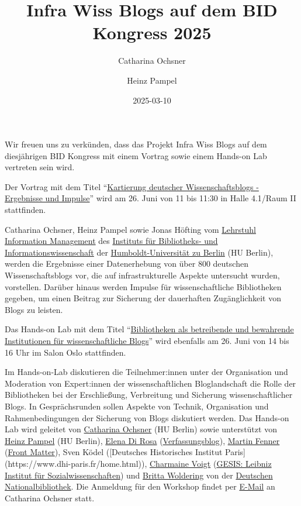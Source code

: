 \documentclass[
  letterpaper,
  DIV=11]{scrartcl}
\title{Infra Wiss Blogs auf dem BID Kongress 2025}
\author{Catharina Ochsner \and Heinz Pampel}
\date{2025-03-10}
\begin{document}
\maketitle


Wir freuen uns zu verkünden, dass das Projekt Infra Wiss Blogs auf dem
diesjährigen BID Kongress mit einem Vortrag sowie einem Hands-on Lab
vertreten sein wird.

Der Vortrag mit dem Titel
``\href{https://bid2025.abstractserver.com/program/\#/details/presentations/307}{Kartierung
deutscher Wissenschaftsblogs - Ergebnisse und Impulse}'' wird am 26.
Juni von 11 bis 11:30 in Halle 4.1/Raum II stattfinden.~

Catharina Ochsner, Heinz Pampel sowie Jonas Höfting vom
\href{https://www.ibi.hu-berlin.de/de/forschung/infomanagement}{Lehrstuhl
Information Management} des
\href{https://www.ibi.hu-berlin.de/de}{Instituts für Bibliotheks- und
Informationswissenschaft} der
\href{https://www.hu-berlin.de/de}{Humboldt-Universität zu Berlin} (HU
Berlin), werden die Ergebnisse einer Datenerhebung von über 800
deutschen Wissenschaftsblogs vor, die auf infrastrukturelle Aspekte
untersucht wurden, vorstellen. Darüber hinaus werden Impulse für
wissenschaftliche Bibliotheken gegeben, um einen Beitrag zur Sicherung
der dauerhaften Zugänglichkeit von Blogs zu leisten.

Das Hands-on Lab mit dem Titel
``\href{https://bid2025.abstractserver.com/program/\#/details/sessions/84}{Bibliotheken
als betreibende und bewahrende Institutionen für wissenschaftliche
Blogs}'' wird ebenfalls am 26. Juni von 14 bis 16 Uhr im Salon Oslo
stattfinden.~

Im Hands-on-Lab diskutieren die Teilnehmer:innen unter der Organisation
und Moderation von Expert:innen der wissenschaftlichen Bloglandschaft
die Rolle der Bibliotheken bei der Erschließung, Verbreitung und
Sicherung wissenschaftlicher Blogs. In Gesprächsrunden sollen Aspekte
von Technik, Organisation und Rahmenbedingungen der Sicherung von Blogs
diskutiert werden. Das Hands-on Lab wird geleitet von
\href{https://www.ibi.hu-berlin.de/de/forschung/infomanagement/teaminfomanagement}{Catharina
Ochsner} (HU Berlin) sowie unterstützt von
\href{https://heinzpampel.de/}{Heinz Pampel} (HU Berlin),
\href{https://verfassungsblog.de/author/elena-di-rosa/}{Elena Di Rosa}
(\href{https://verfassungsblog.de/}{Verfassungsblog}),
\href{https://front-matter.io/team}{Martin Fenner}
(\href{https://front-matter.io/}{Front Matter}), Sven Ködel
({[}Deutsches Historisches Institut Paris{]}
(https://www.dhi-paris.fr/home.html)),
\href{https://www.gesis.org/institut/ueber-uns/mitarbeitendenverzeichnis/person/Charmaine.Voigt}{Charmaine
Voigt} (\href{https://www.gesis.org/home}{GESIS: Leibniz Institut für
Sozialwissenschaften}) und
\href{https://www.dnb.de/SharedDocs/Kontaktdaten/DE/wolderingBritta.html}{Britta
Woldering} von der
\href{https://www.dnb.de/DE/Home/home_node.html}{Deutschen
Nationalbibliothek}. Die Anmeldung für den Workshop findet per
\href{mailto:catharina.ochsner@hu-berlin.de}{E-Mail} an Catharina
Ochsner statt.
\end{document}
